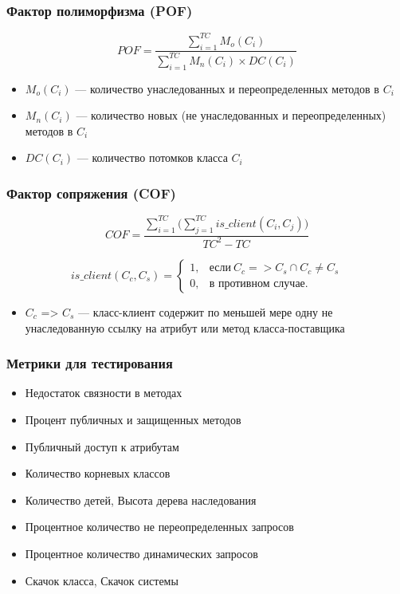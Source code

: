 \documentclass{../../slides-style}
\begin{document}
    \begin{frame}
        \frametitle{Фактор полиморфизма (POF)}
        $$POF = \frac{\sum\limits_{i=1}^{TC}M_o(C_i)}{\sum\limits_{i=1}^{TC}M_n(C_i) \times DC(C_i)}$$
        \begin{itemize}
            \item $M_o(C_i)$ --- количество унаследованных и переопределенных методов в $C_i$
            \item $M_n(C_i)$ --- количество новых (не унаследованных и переопределенных) методов в $C_i$
            \item $DC(C_i)$ --- количество потомков класса $C_i$
        \end{itemize}
    \end{frame}

    \begin{frame}
        \frametitle{Фактор сопряжения (COF)}
        $$COF = \frac{\sum\limits_{i=1}^{TC}\biggl(\sum\limits_{j=1}^{TC}is\_client(C_i, C_j)\biggl)}{TC^2 - TC}$$

        \begin{equation*}
            is\_client(C_c, C_s) = \begin{cases}
                1, & \text{если}\ C_c => C_s \cap C_c \neq C_s \\
                0, & \text{в противном случае}.
            \end{cases}
        \end{equation*}

        \begin{itemize}
            \item $C_c$ => $C_s$ --- класс-клиент содержит по меньшей мере одну не унаследованную ссылку на атрибут или метод класса-поставщика
        \end{itemize}
    \end{frame}

    \begin{frame}
        \frametitle{Метрики для тестирования}
        \begin{itemize}
            \item Недостаток связности в методах
            \item Процент публичных и защищенных методов
            \item Публичный доступ к атрибутам
            \item Количество корневых классов
            \item Количество детей, Высота дерева наследования
            \item Процентное количество не переопределенных запросов
            \item Процентное количество динамических запросов
            \item Скачок класса, Скачок системы
        \end{itemize}
    \end{frame}
\end{document}
